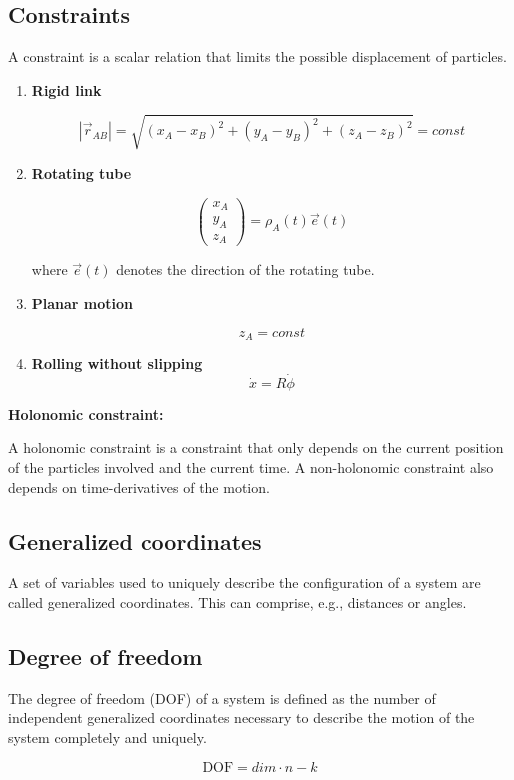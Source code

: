 \documentclass[10pt,a4paper]{scrartcl}
\begin{document}
\begin{multicols*}{2}
\subsection{Constraints}

A constraint is a scalar relation that limits the possible displacement of particles.

\begin{enumerate}[label=(\alph*)]
\item \textbf{Rigid link}

\[|\vec{r}_{AB}| = \sqrt{(x_A-x_B)^2+(y_A-y_B)^2+(z_A-z_B)^2} = const\]
\item \textbf{Rotating tube}

\[\begin{pmatrix}
x_A\\y_A\\z_A
\end{pmatrix}=\rho_A(t)\vec{e}(t)
\]

where $\vec{e}(t)$ denotes the direction of the rotating tube.
\item \textbf{Planar motion}

\[z_A = const\]
\item \textbf{Rolling without slipping}
\[\dot{x}=R\dot{\phi}\]
\end{enumerate}

\textbf{Holonomic constraint:}

A holonomic constraint is a constraint that only depends on the current
position of the particles involved and the current time. A non-holonomic constraint
also depends on time-derivatives of the motion.

\subsection{Generalized coordinates}

A set of variables used to uniquely describe the configuration of a system
are called generalized coordinates. This can comprise, e.g., distances or angles.

\subsection{Degree of freedom}

The degree of freedom (DOF) of a system is defined as the number of
independent generalized coordinates necessary to describe the motion of the system
completely and uniquely.

\begin{equation*}
\text{DOF} = dim\cdot n -k
\end{equation*}


\end{multicols*}
\end{document}
